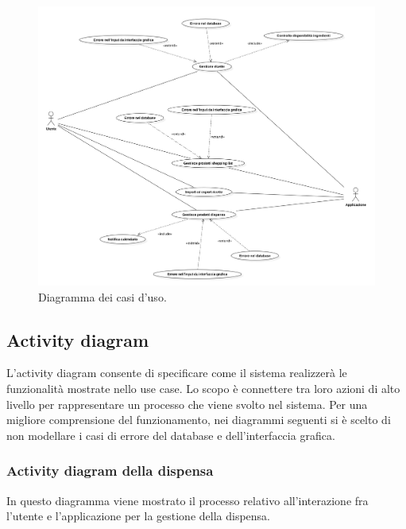 \documentclass{article}
\begin{document}
\begin{figure}[h!]
    \includegraphics[width=\linewidth]{images/use-case.png}
    \caption{Diagramma dei casi d'uso.}
    \label{fig:usecase}
\end{figure}

\subsection{Activity diagram}

L'activity diagram consente di specificare come il sistema realizzerà le funzionalità mostrate nello use case. Lo scopo è connettere tra loro azioni di alto livello per rappresentare un processo che viene svolto nel sistema. Per una migliore comprensione del funzionamento, nei diagrammi seguenti si è scelto di non modellare i casi di errore del database e dell'interfaccia grafica. 

\subsubsection{Activity diagram della dispensa}

In questo diagramma viene mostrato il processo relativo all'interazione fra l'utente e l'applicazione per la gestione della dispensa. 
\end{document}
